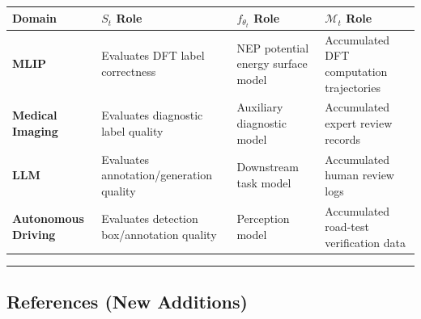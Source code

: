 \documentclass[
  12pt,
]{article}
\begin{document}
\begin{longtable}[]{@{}
  >{\raggedright\arraybackslash}p{}
  >{\raggedright\arraybackslash}p{}
  >{\raggedright\arraybackslash}p{}
  >{\raggedright\arraybackslash}p{}@{}}
\toprule\noalign{}
\begin{minipage}[b]{\linewidth}\raggedright
Domain
\end{minipage} & \begin{minipage}[b]{\linewidth}\raggedright
$S_t$ Role
\end{minipage} & \begin{minipage}[b]{\linewidth}\raggedright
$f_{\theta_t}$ Role
\end{minipage} & \begin{minipage}[b]{\linewidth}\raggedright
$\mathcal{M}_t$ Role
\end{minipage} \\
\midrule\noalign{}
\endhead
\bottomrule\noalign{}
\endlastfoot
\textbf{MLIP} & Evaluates DFT label correctness & NEP potential energy surface model & Accumulated DFT computation trajectories \\
\textbf{Medical Imaging} & Evaluates diagnostic label quality & Auxiliary diagnostic model & Accumulated expert review records \\
\textbf{LLM} & Evaluates annotation/generation quality & Downstream task model & Accumulated human review logs \\
\textbf{Autonomous Driving} & Evaluates detection box/annotation quality & Perception model & Accumulated road-test verification data \\
\end{longtable}

\begin{center}\rule{0.5\linewidth}{0.5pt}\end{center}

\subsection{References (New Additions)}\label{references-new-additions}
\end{document}
